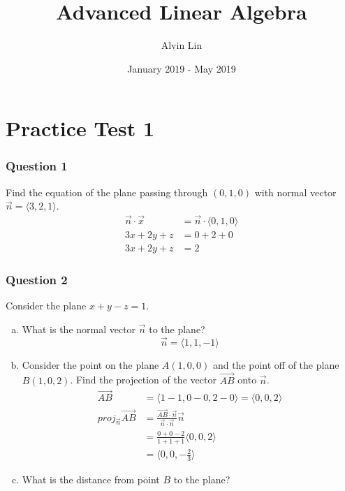 \documentclass{math}
\title{Advanced Linear Algebra}
\author{Alvin Lin}
\date{January 2019 - May 2019}
\begin{document}
\maketitle

\section*{Practice Test 1}

\subsubsection*{Question 1}
Find the equation of the plane passing through \( (0, 1, 0) \) with normal
vector \( \vec{n} = \langle3,2,1\rangle \).
\begin{align*}
  \vec{n}\cdot\vec{x} &= \vec{n}\cdot\langle0,1,0\rangle \\
  3x+2y+z &= 0+2+0 \\
  3x+2y+z &= 2
\end{align*}

\subsubsection*{Question 2}
Consider the plane \( x+y-z = 1 \).
\begin{enumerate}[(a)]
  \item What is the normal vector \( \vec{n} \) to the plane?
  \[ \vec{n} = \langle1,1,-1\rangle \]
  \item Consider the point on the plane \( A(1,0,0) \) and the point off of the
    plane \( B(1,0,2) \). Find the projection of the vector
    \( \overrightarrow{AB} \) onto \( \vec{n} \).
  \begin{align*}
    \overrightarrow{AB} &= \langle1-1,0-0,2-0\rangle = \langle0,0,2\rangle \\
    proj_{\vec{n}}\overrightarrow{AB} &= \frac{\overrightarrow{AB}\cdot\vec{n}}
      {\vec{n}\cdot\vec{n}}\vec{n} \\
    &= \frac{0+0-2}{1+1+1}\langle0,0,2\rangle \\
    &= \langle0,0,-\frac{2}{3}\rangle
  \end{align*}
  \item What is the distance from point \( B \) to the plane?
\end{enumerate}
\end{document}
